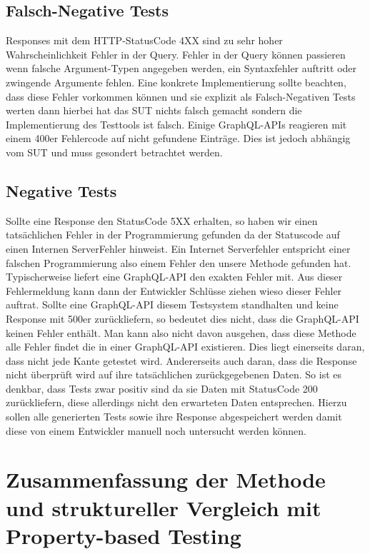 \subsection{Falsch-Negative Tests}

Responses mit dem HTTP-StatusCode 4XX sind zu sehr hoher Wahrscheinlichkeit Fehler in der Query.
Fehler in der Query können passieren wenn falsche Argument-Typen angegeben werden, ein Syntaxfehler auftritt oder
zwingende Argumente fehlen.
Eine konkrete Implementierung sollte beachten, dass diese Fehler vorkommen können und sie explizit als Falsch-Negativen Tests werten dann
hierbei hat das SUT nichts falsch gemacht sondern die Implementierung des Testtools ist falsch.
Einige GraphQL-APIs reagieren mit einem 400er Fehlercode auf nicht gefundene Einträge.
Dies ist jedoch abhängig vom SUT und muss gesondert betrachtet werden.

\subsection{Negative Tests}

Sollte eine Response den StatusCode 5XX erhalten, so haben wir einen tatsächlichen Fehler in der Programmierung gefunden
da der Statuscode auf einen Internen ServerFehler hinweist.
Ein Internet Serverfehler entspricht einer falschen Programmierung also einem Fehler den unsere Methode gefunden hat.
Typischerweise liefert eine GraphQL-API den exakten Fehler mit.
Aus dieser Fehlermeldung kann dann der Entwickler Schlüsse ziehen wieso dieser Fehler auftrat.
Sollte eine GraphQL-API diesem Testsystem standhalten und keine Response mit 500er zurückliefern, so bedeutet dies nicht,
dass die GraphQL-API keinen Fehler enthält.
Man kann also nicht davon ausgehen, dass diese Methode alle Fehler findet die in einer GraphQL-API existieren.
Dies liegt einerseits daran, dass nicht jede Kante getestet wird.
Andererseits auch daran, dass die Response nicht überprüft wird auf ihre tatsächlichen zurückgegebenen Daten.
So ist es denkbar, dass Tests zwar positiv sind da sie Daten mit StatusCode 200 zurückliefern, diese allerdings
nicht den erwarteten Daten entsprechen.
Hierzu sollen alle generierten Tests sowie ihre Response abgespeichert werden damit diese von einem Entwickler manuell
noch untersucht werden können.

\section{Zusammenfassung der Methode und struktureller Vergleich mit Property-based Testing}

